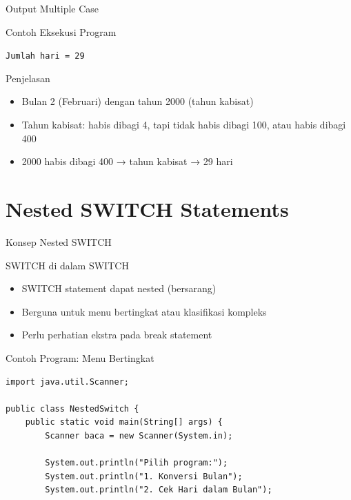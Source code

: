 \documentclass{beamer}
\begin{document}
\begin{frame}{Output Multiple Case}
\begin{block}{Contoh Eksekusi Program}
\colorbox{gray!20}{
    \parbox{0.9\textwidth}{
        \texttt{Jumlah hari = 29}
    }
}
\end{block}

\begin{block}{Penjelasan}
\begin{itemize}
\item Bulan 2 (Februari) dengan tahun 2000 (tahun kabisat)
\item Tahun kabisat: habis dibagi 4, tapi tidak habis dibagi 100, atau habis dibagi 400
\item 2000 habis dibagi 400 → tahun kabisat → 29 hari
\end{itemize}
\end{block}
\end{frame}

\section{Nested SWITCH Statements}
\begin{frame}[fragile]{Konsep Nested SWITCH}
  \begin{block}{SWITCH di dalam SWITCH}
    \begin{itemize}
      \item SWITCH statement dapat nested (bersarang)
      \item Berguna untuk menu bertingkat atau klasifikasi kompleks
      \item Perlu perhatian ekstra pada break statement
    \end{itemize}
  \end{block}

  \begin{exampleblock}{Contoh Program: Menu Bertingkat}
    \begin{lstlisting}
import java.util.Scanner;

public class NestedSwitch {
    public static void main(String[] args) {
        Scanner baca = new Scanner(System.in);
        
        System.out.println("Pilih program:");
        System.out.println("1. Konversi Bulan");
        System.out.println("2. Cek Hari dalam Bulan");
    \end{lstlisting}
  \end{exampleblock}
\end{frame}
\end{document}
